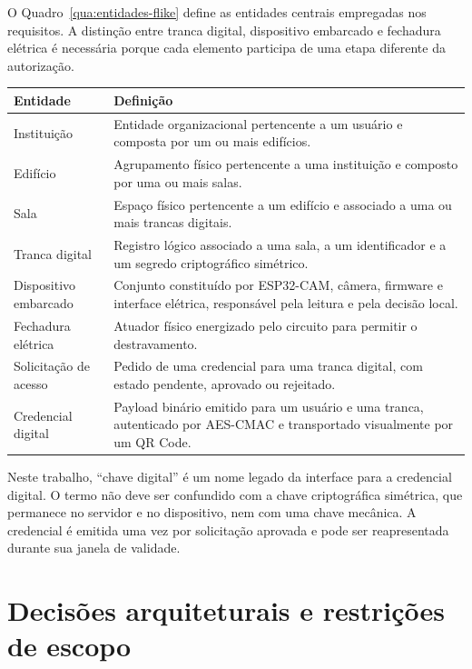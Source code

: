 O Quadro~\ref{qua:entidades-flike} define as entidades centrais empregadas nos requisitos. A distinção entre tranca digital, dispositivo embarcado e fechadura elétrica é necessária porque cada elemento participa de uma etapa diferente da autorização.

\begin{quadro}[htb]
    \caption{Entidades centrais do FLIKE}
    \label{qua:entidades-flike}
    \small
    \begin{tabular}{|p{}|p{}|}
        \hline
        \textbf{Entidade} & \textbf{Definição} \\ \hline
        Instituição & Entidade organizacional pertencente a um usuário e composta por um ou mais edifícios. \\ \hline
        Edifício & Agrupamento físico pertencente a uma instituição e composto por uma ou mais salas. \\ \hline
        Sala & Espaço físico pertencente a um edifício e associado a uma ou mais trancas digitais. \\ \hline
        Tranca digital & Registro lógico associado a uma sala, a um identificador e a um segredo criptográfico simétrico. \\ \hline
        Dispositivo embarcado & Conjunto constituído por ESP32-CAM, câmera, firmware e interface elétrica, responsável pela leitura e pela decisão local. \\ \hline
        Fechadura elétrica & Atuador físico energizado pelo circuito para permitir o destravamento. \\ \hline
        Solicitação de acesso & Pedido de uma credencial para uma tranca digital, com estado pendente, aprovado ou rejeitado. \\ \hline
        Credencial digital & Payload binário emitido para um usuário e uma tranca, autenticado por AES-CMAC e transportado visualmente por um QR Code. \\ \hline
    \end{tabular}
\end{quadro}

Neste trabalho, ``chave digital'' é um nome legado da interface para a credencial digital. O termo não deve ser confundido com a chave criptográfica simétrica, que permanece no servidor e no dispositivo, nem com uma chave mecânica. A credencial é emitida uma vez por solicitação aprovada e pode ser reapresentada durante sua janela de validade.

\section{Decisões arquiteturais e restrições de escopo}

